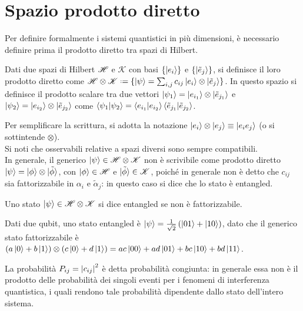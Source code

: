 
\section{Spazio prodotto diretto}

Per definire formalmente i sistemi quantistici in più dimensioni, è necessario definire prima il prodotto diretto tra spazi di Hilbert.

\begin{definition}
	Dati due spazi di Hilbert $ \mathscr{H} $ e $ \mathscr{K} $ con basi $ \{\ket{e_i}\} $ e $ \{\ket{\tilde{e}_j}\} $, si definisce il loro prodotto diretto come $ \hilb \otimes \mathscr{K} \defeq \{ \ket{\psi} = \sum_{i,j} c_{ij} \ket{e_i} \otimes \ket{\tilde{e}_j} \} $. In questo spazio si definisce il prodotto scalare tra due vettori $ \ket{\psi_1} = \ket{e_{i_1}}\otimes\ket{\tilde{e}_{j_1}} $ e $ \ket{\psi_2} = \ket{e_{i_2}}\otimes\ket{\tilde{e}_{j_2}} $ come $ \braket{\psi_1 | \psi_2} = \braket{e_{i_1} | e_{i_2}}\braket{\tilde{e}_{j_1} | \tilde{e}_{j_2}} $.
\end{definition}

Per semplificare la scrittura, si adotta la notazione $ \ket{e_i}\otimes\ket{e_j} \equiv \ket{e_i e_j} $ (o si sottintende $ \otimes $).\\
Si noti che osservabili relative a spazi diversi sono sempre compatibili.\\
In generale, il generico $ \ket{\psi}\in\mathscr{H}\otimes\mathscr{K} $ non è scrivibile come prodotto diretto $ \ket{\psi} = \ket{\phi}\otimes\ket{\tilde{\phi}} $, con $ \ket{\phi}\in\mathscr{H} $ e $ \ket{\tilde{\phi}}\in\mathscr{K} $, poiché in generale non è detto che $ c_{ij} $ sia fattorizzabile in $ \alpha_i $ e $ \tilde{\alpha}_j $: in questo caso si dice che lo stato è entangled.

\begin{definition}
	Uno stato $ \ket{\psi}\in\mathscr{H}\otimes\mathscr{K} $ si dice entangled se non è fattorizzabile.
\end{definition}

\begin{example}
	Dati due qubit, uno stato entangled è $ \ket{\psi} = \frac{1}{\sqrt{2}} \left(\ket{01} + \ket{10}\right) $, dato che il generico stato fattorizzabile è $ \left(a\ket{0} + b\ket{1}\right)\otimes\left(c\ket{0} + d\ket{1}\right) = ac\ket{00} + ad\ket{01} + bc\ket{10} + bd\ket{11} $.
\end{example}

La probabilità $ P_{ij} = \left\lvert c_{ij}\right\rvert^2 $ è detta probabilità congiunta: in generale essa non è il prodotto delle probabilità dei singoli eventi per i fenomeni di interferenza quantistica, i quali rendono tale probabilità dipendente dallo stato dell'intero sistema.

